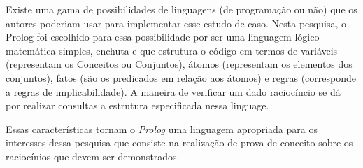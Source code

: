 Existe uma gama de possibilidades de linguagens (de programação ou não) que os autores poderiam usar para implementar esse estudo de caso. Nesta pesquisa, o Prolog foi escolhido para essa possibilidade por ser uma linguagem lógico-matemática simples, enchuta e que estrutura o código em termos de variáveis (representam os Conceitos ou Conjuntos), átomos (representam os elementos dos conjuntos),  fatos (são os predicados em relação aos átomos) e regras (corresponde a regras de implicabilidade). A maneira de verificar um dado raciocíncio se dá por realizar consultas a estrutura especificada nessa linguage. 

Essas características tornam o \textit{Prolog} uma linguagem apropriada para os interesses dessa pesquisa que consiste na realização de prova de conceito sobre os raciocínios que devem ser demonstrados. 